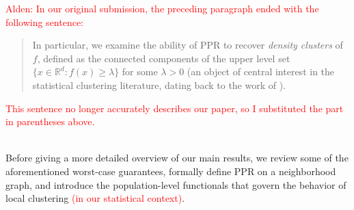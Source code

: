 \documentclass[11pt,twoside]{article}
\newcommand{\Reals}{\mathbb{R}}
\newcommand{\1}{\mathbf{1}}
\newcommand{\Rd}{\Reals^d}
\begin{document}
\textcolor{red}{Alden: In our original submission, the preceding paragraph ended with the following sentence:
\begin{quote}
	In particular, we examine the ability of
	PPR to recover \emph{density clusters} of $f$, defined as the connected
	components of the upper level set $\{x \in \Rd : f(x) \geq \lambda\}$ for some
	$\lambda > 0$ (an object of central interest in the statistical clustering
	literature, dating back to the work of \citet{hartigan1981}). 
\end{quote}
This sentence no longer accurately describes our paper, so I substituted the part in parentheses above.}\\

Before giving a more detailed overview of our main results, we review some of the aforementioned worst-case guarantees, formally define PPR on a neighborhood graph, and introduce the population-level functionals that govern the behavior of local clustering \textcolor{red}{(in our statistical context)}. 
\end{document}
